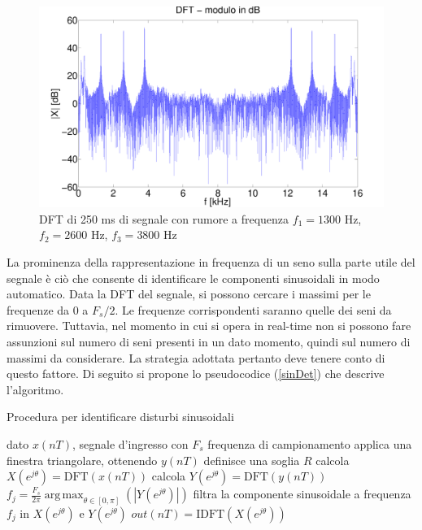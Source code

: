 \documentclass[10pt,A4]{article}
\DeclareMathOperator*{\argmax}{arg\,max}
\begin{document}
\begin{figure}[h]
  \centering
  \includegraphics[width = 1\textwidth, keepaspectratio]{images/DFTdB.pdf}
  \caption{DFT di 250 ms di segnale con rumore a frequenza $f_1 = 1300$ Hz, $f_2 = 2600$ Hz, $f_3 = 3800$ Hz}
  \label{fig:unfilt}
\end{figure}

La prominenza della rappresentazione in frequenza di un seno sulla parte utile del segnale è ciò che consente di identificare le componenti sinusoidali in modo automatico. Data la DFT del segnale, si possono cercare i massimi per le frequenze da 0 a $F_s/2$. Le frequenze corrispondenti saranno quelle dei seni da rimuovere. Tuttavia, nel momento in cui si opera in real-time non si possono fare assunzioni sul numero di seni presenti in un dato momento, quindi sul numero di massimi da considerare. La strategia adottata pertanto deve tenere conto di questo fattore. Di seguito si propone lo pseudocodice (\ref{sinDet}) che descrive l'algoritmo. \\
\newpage

\begin{algorithm}
  \caption{Procedura per identificare disturbi sinusoidali}\label{sinDet}
  \begin{algorithmic}[1]
    \Procedure{}{}
    \State dato $x(nT)$, segnale d'ingresso con
    \State $F_s$ frequenza di campionamento
    \State applica una finestra triangolare, ottenendo $y(nT)$
    \State definisce una soglia $R$
    \State calcola $X(e^{j\theta}) = \mathrm{DFT}(x(nT))$
    \State calcola $Y(e^{j\theta}) = \mathrm{DFT}(y(nT))$
    \State $f_j = \frac{F_s}{2\pi} \argmax_{\theta \in [0, \pi]}(|Y(e^{j\theta})|)$
    \State filtra la componente sinusoidale a frequenza $f_j$ in $X(e^{j\theta})$ e $Y(e^{j\theta})$
    \EndWhile
    \State $out(nT) = \mathrm{IDFT}(X(e^{j\theta}))$
    \EndProcedure
  \end{algorithmic}
\end{algorithm}
\end{document}
